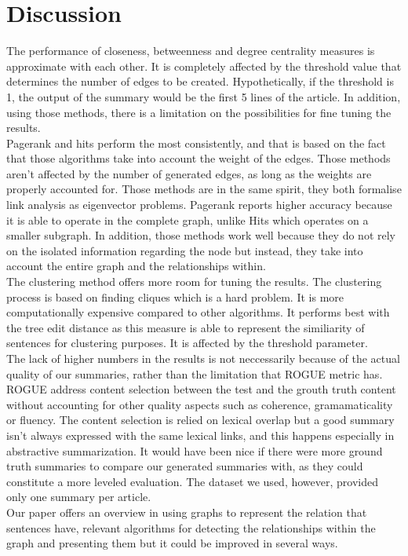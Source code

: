 \documentclass[9pt,twocolumn,twoside]{pnas-report}
\begin{document}
\section*{Discussion}
The performance of closeness, betweenness and degree centrality measures is approximate with each other. It is completely affected by the threshold value that determines the number of edges to be created. Hypothetically, if the threshold is 1, the output of the summary would be the first 5 lines of the article. In addition, using those methods, there is a limitation on the possibilities for fine tuning the results. \\
Pagerank and hits perform the most consistently, and that is based on the fact that those algorithms take into account the weight of the edges. Those methods aren't affected by the number of generated edges, as long as the weights are properly accounted for. Those methods are in the same spirit, they both formalise link analysis as eigenvector problems. Pagerank reports higher accuracy because it is able to operate in the complete graph, unlike Hits which operates on a smaller subgraph. In addition, those methods work well because they do not rely on the isolated information regarding the node but instead, they take into account the entire graph and the relationships within. \\
The clustering method offers more room for tuning the results. The clustering process is based on finding cliques which is a hard problem. It is more computationally expensive compared to other algorithms. It performs best with the tree edit distance as this measure is able to represent the similiarity of sentences for clustering purposes. It is affected by the threshold parameter. \\
The lack of higher numbers in the results is not neccessarily because of the actual quality of our summaries, rather than the limitation that ROGUE metric has. ROGUE address content selection between the test and the grouth truth content without accounting for other quality aspects such as coherence, gramamaticality or fluency. The content selection is relied on lexical overlap but a good summary isn't always expressed with the same lexical links, and this happens especially in abstractive summarization. It would have been nice if there were more ground truth summaries to compare our generated summaries with, as they could constitute a more leveled evaluation. The dataset we used, however, provided only one summary per article. \\ 
Our paper offers an overview in using graphs to represent the relation that sentences have, relevant algorithms for detecting the relationships within the graph and presenting them but it could be improved in several ways.
\end{document}
